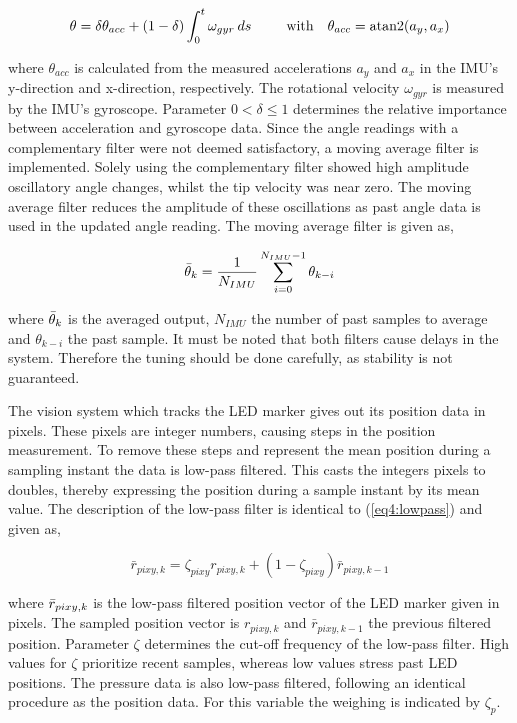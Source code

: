 \begin{equation}
    \theta = \delta \theta_{acc} + (1-\delta) \int_0^t \omega_{gyr} \hspace{2pt} ds    \hspace{25pt} \text{with}  \hspace{10pt} \theta_{acc} = \operatorname{atan2}(a_y,a_x)
\end{equation}

where $\theta_{acc}$ is calculated from the measured accelerations $a_y$ and $a_x$ in the IMU's y-direction and x-direction, respectively. The rotational velocity $\omega_{gyr}$ is measured by the IMU's gyroscope. Parameter $0 < \delta \leq 1$ determines the relative importance between acceleration and gyroscope data. Since the angle readings with a complementary filter were not deemed satisfactory, a moving average filter is implemented. Solely using the complementary filter showed high amplitude oscillatory angle changes, whilst the tip velocity was near zero. The moving average filter reduces the amplitude of these oscillations as past angle data is used in the updated angle reading. The moving average filter is given as,

\begin{equation}
    \Bar{\theta}_k = \frac{1}{N_{IMU}}\sum_{i = 0} ^ {N_{IMU}-1} \theta_{k-i}
\end{equation}

where $\Bar{\theta}_k$ is the averaged output, $N_{IMU}$ the number of past samples to average and $\theta_{k-i}$ the past sample. It must be noted that both filters cause delays in the system. Therefore the tuning should be done carefully, as stability is not guaranteed.

The vision system which tracks the LED marker gives out its position data in pixels. These pixels are integer numbers, causing steps in the position measurement. To remove these steps and represent the mean position during a sampling instant the data is low-pass filtered. This casts the integers pixels to doubles, thereby expressing the position during a sample instant by its mean value. The description of the low-pass filter is identical to (\ref{eq4:lowpass}) and given as,

\begin{equation}
\bar{r}_{pixy,k} = \zeta_{pixy} r_{pixy,k} + (1-\zeta_{pixy})\bar{r}_{pixy,k-1}
\label{eq5:lowpass}
\end{equation}

where $\Bar{r}_{pixy,k}$ is the low-pass filtered position vector of the LED marker given in pixels. The sampled position vector is $r_{pixy,k}$ and $\bar{r}_{pixy,k-1}$ the previous filtered position. Parameter $\zeta$ determines the cut-off frequency of the low-pass filter. High values for $\zeta$ prioritize recent samples, whereas low values stress past LED positions. The pressure data is also low-pass filtered, following an identical procedure as the position data. For this variable the weighing is indicated by $\zeta_p$. 






